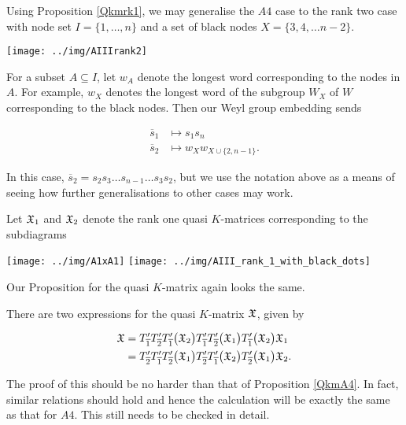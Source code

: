 \documentclass[a4 paper, 10pt]{article}
\begin{document}
Using Proposition \ref{Qkmrk1}, we may generalise the $A4$ case to the rank two case with node set $I = \{ 1, \dots, n \}$ and a set of black nodes $X = \{ 3, 4, \dots n-2 \}$.


\begin{center}
\texttt{[image: ../img/AIIIrank2]}
\end{center}

\noindent For a subset $A \subseteq I$, let $w_A$ denote the longest word corresponding to the nodes in $A$. For example, $w_X$ denotes the longest word of the subgroup $W_X$ of $W$ corresponding to the black nodes. Then our Weyl group embedding sends

\begin{align*}
\overline{s}_1 &\mapsto s_1s_n\\
\overline{s}_2 &\mapsto w_Xw_{ X \cup \{2,n-1\}}.
\end{align*}

\noindent In this case, $\overline{s}_2 = s_2s_3 \dots s_{n-1} \dots s_3s_2$, but we use the notation above as a means of seeing how further generalisations to other cases may work.


Let $\mathfrak{X}_1$ and $\mathfrak{X}_2$ denote the rank one quasi $K$-matrices corresponding to the subdiagrams 

\begin{center}
\texttt{[image: ../img/A1xA1]} \qquad \texttt{[image: ../img/AIII\_rank\_1\_with\_black\_dots]}
\end{center}

Our Proposition for the quasi $K$-matrix again looks the same.

\begin{proposition} \label{QkmAIII}
There are two expressions for the quasi $K$-matrix $\mathfrak{X}$, given by 

\begin{align}
	\mathfrak{X} &= T_{\overline{1}}^{\prime}T_{\overline{2}}^{\prime}T_{\overline{1}}^{\prime}\big( \mathfrak{X}_2 \big) T_{\overline{1}}^{\prime}T_{\overline{2}}^{\prime}\big( \mathfrak{X}_1 \big) T_{\overline{1}}^{\prime}\big( \mathfrak{X}_2 \big) \mathfrak{X}_1\\
		&= T_{\overline{2}}^{\prime}T_{\overline{1}}^{\prime}T_{\overline{2}}^{\prime}\big( \mathfrak{X}_1 \big) T_{\overline{2}}^{\prime}T_{\overline{1}}^{\prime}\big( \mathfrak{X}_2 \big) T_{\overline{2}}^{\prime}\big( \mathfrak{X}_1 \big) \mathfrak{X}_2.
\end{align}
\end{proposition}

\noindent The proof of this should be no harder than that of Proposition \ref{QkmA4}. In fact, similar relations should hold and hence the calculation will be exactly the same as that for $A4$. This still needs to be checked in detail.



\end{document}

